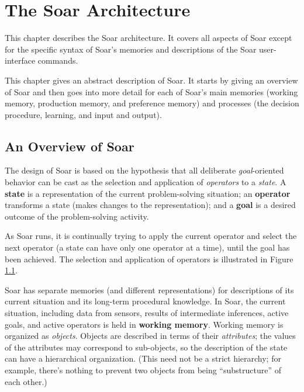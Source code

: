 \chapter{The Soar Architecture}
\label{ARCH}

This chapter describes the Soar architecture.  It covers all aspects of Soar except for the specific syntax of Soar's memories and descriptions of the Soar user-interface commands.

This chapter gives an abstract description of Soar.  It starts by giving an overview of Soar and then goes into more detail for each of Soar's main memories (working memory, production memory, and preference memory) and processes (the decision procedure, learning, and input and output).

\section{An Overview of Soar}
\label{ARCH-overview}

The design of Soar is based on the hypothesis that all deliberate \textit{goal}-oriented behavior can be cast as the selection and application of \textit{operators} to a \textit{state}. A \textbf{state} is a representation of the current problem-solving situation; an \textbf{operator} transforms a state (makes changes to the representation); and a \textbf{goal} is a desired outcome of the problem-solving activity.

As Soar runs, it is continually trying to apply the current operator and select the next operator (a state can have only one operator at a time), until the goal has been achieved. The selection and application of operators is illustrated in Figure \ref{fig:select-apply}.

\begin{figure}
	\label{fig:select-apply}
\end{figure}

Soar has separate memories (and different representations) for descriptions of its current situation and its long-term procedural knowledge. In Soar, the current situation, including data from sensors, results of intermediate inferences, active goals, and active operators is held in \textbf{working memory}.  Working memory is organized as \emph{objects}. Objects are described in terms of their \emph{attributes}; the values of the attributes may correspond to sub-objects, so the description of the state can have a hierarchical organization. (This need not be a strict hierarchy; for example, there's nothing to prevent two objects from being ``substructure'' of each other.)

